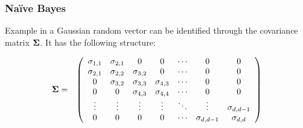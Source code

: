 \begin{frame}
  \frametitle{Na{\"i}ve Bayes \cont}

  \begin{ovalblock}{Example}
     in a Gaussian random vector can be identified through the covariance matrix ${\bm \Sigma}$. It has the following structure:
    
    \begin{eqnarray*}
      {\bm \Sigma} &=& \left(
        \begin{array}{ccccccc}
          \sigma_{1,1} & \sigma_{2,1} & 0            & 0            & \cdots & 0              & 0 \\
          \sigma_{2,1} & \sigma_{2,2} & \sigma_{3,2} & 0            & \cdots & 0              & 0 \\
          0            & \sigma_{3,2} & \sigma_{3,3} & \sigma_{4,3} & \cdots & 0              & 0 \\
          0            & 0            & \sigma_{4,3} & \sigma_{4,4} & \cdots & 0              & 0 \\
          \vdots       & \vdots       & \vdots       & \vdots       & \ddots & \vdots         & \sigma_{d,d-1} \\
          0            & 0            & 0            & 0            & \cdots & \sigma_{d,d-1} & \sigma_{d,d} \\
        \end{array}
      \right)
    \end{eqnarray*}
  \end{ovalblock}
\end{frame}


